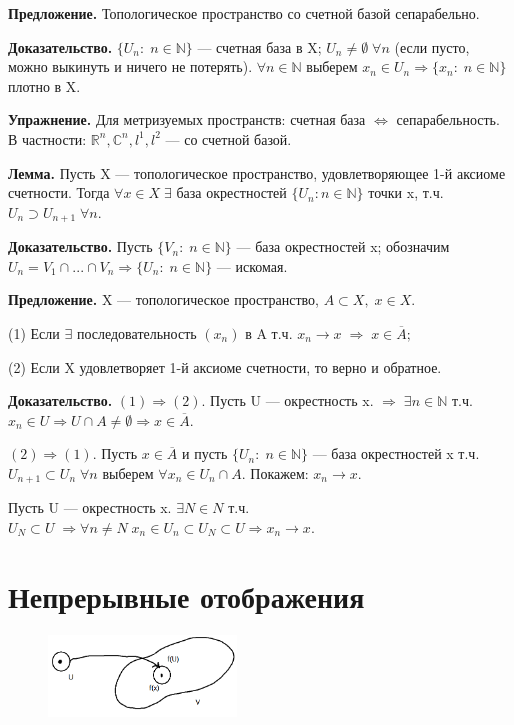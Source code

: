 \documentclass[12pt,a4paper]{article}
\begin{document}
\textbf{Предложение.} Топологическое пространство со счетной базой сепарабельно. 

\textbf{Доказательство.} $\{U_{n}: \; n \in \mathbb{N}\}$ --- счетная база в X; $U_{n} \neq \emptyset \; \forall n$ (если пусто, можно выкинуть и ничего не потерять). $\forall n \in \mathbb{N}$ выберем $x_{n} \in U_{n} \Rightarrow \{x_{n}: \; n \in \mathbb{N}\}$ плотно в X. 

\textbf{Упражнение.} Для метризуемых пространств: счетная база $\Leftrightarrow$ сепарабельность. В частности: $\mathbb{R}^n, \mathbb{C}^n, l^{1}, l^{2}$ --- со счетной базой. 

\textbf{Лемма.} Пусть X --- топологическое пространство, удовлетворяющее 1-й аксиоме счетности. Тогда $\forall x \in X\; \exists$ база окрестностей $\{U_{n}: n \in \mathbb{N}\}$ точки x, т.ч. $U_{n} \supset U_{n + 1} \; \forall n.$

\textbf{Доказательство.} Пусть $\{V_{n}: \; n \in \mathbb{N}\}$ --- база окрестностей x; обозначим $U_{n} = V_{1} \cap ... \cap V_{n} \Rightarrow \{U_{n}: \; n \in \mathbb{N}\}$ --- искомая. 

\textbf{Предложение.} X --- топологическое пространство, $A \subset X, \; x \in X.$ 

(1) Если $\exists$ последовательность $(x_{n})$ в A т.ч. $x_{n} \to x \; \Rightarrow \; x \in \overline{A};$ 

(2) Если X удовлетворяет 1-й аксиоме счетности, то верно и обратное. 

\textbf{Доказательство.} $(1) \Rightarrow (2).$ Пусть U --- окрестность x. $\Rightarrow \; \exists n \in \mathbb{N}$ т.ч. $x_{n} \in U \Rightarrow U \cap A \neq \emptyset \Rightarrow x \in \overline{A}.$ 

$(2) \Rightarrow (1).$ Пусть $x \in \overline{A}$ и пусть $\{U_{n}: \; n \in \mathbb{N}\}$ --- база окрестностей x т.ч. $U_{n + 1} \subset U_{n} \; \forall n$ выберем $\forall x_{n} \in U_{n} \cap A.$ Покажем: $x_{n} \to x.$ 

Пусть U --- окрестность x. $\exists N \in N$ т.ч. $U_{N} \subset U \; \Rightarrow \forall n \neq N \; x_{n} \in U_{n} \subset U_{N} \subset U \Rightarrow x_{n} \to x.$

\section{Непрерывные отображения} 

\begin{figure}
	\includegraphics[width = 5cm]{lect4_3.png}
\end{figure}
\end{document}
